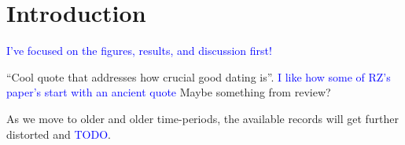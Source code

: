 \documentclass[draft]{agujournal2019}
\newcommand{\ijk}{\textcolor{blue}}
\begin{document}

%
%
%
%






\section{Introduction}\label{sec:intro}

\ijk{I've focused on the figures, results, and discussion first!}

``Cool quote that addresses how crucial good dating is''.
\ijk{I like how some of RZ's paper's start with an ancient quote}
Maybe something from  review?

As we move to older and older time-periods, the available records will get further distorted and \ijk{TODO}.
\end{document}
